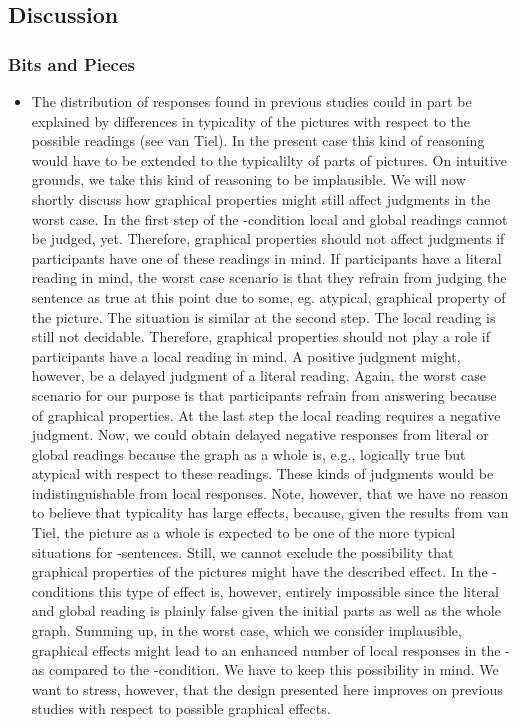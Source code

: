 \documentclass[fleqn,reqno,10pt,draft]{article}
\newcommand{\as}{\acro{as}}
\renewcommand{\es}{\acro{es}}
\begin{document}
\subsection{Discussion}
\label{sec:discussion}

\subsubsection{Bits and Pieces}
\label{sec:bits-pieces}

\begin{itemize}
\item The distribution of
responses found in previous studies could in part be explained by
differences in typicality of the pictures with respect to the possible
readings (see van Tiel). In the present case this kind of reasoning
would have to be extended to the typicalilty of parts of pictures. On
intuitive grounds, we take this kind of reasoning to be
implausible. We will now shortly discuss how graphical properties
might still affect judgments in the worst case. In the first step of
the \as-condition local and global readings cannot be judged,
yet. Therefore, graphical properties should not affect judgments if
participants have one of these readings in mind. If participants have
a literal reading in mind, the worst case scenario is that they
refrain from judging the sentence as true at this point due to some,
eg. atypical, graphical property of the picture. The situation is
similar at the second step. The local reading is still not
decidable. Therefore, graphical properties should not play a role if
participants have a local reading in mind. A positive judgment might,
however, be a delayed judgment of a literal reading. Again, the worst
case scenario for our purpose is that participants refrain from
answering because of graphical properties. At the last step the local
reading requires a negative judgment. Now, we could obtain delayed
negative responses from literal or global readings because the graph
as a whole is, e.g., logically true but atypical with respect to these
readings. These kinds of judgments would be indistinguishable from
local responses. Note, however, that we have no reason to believe that
typicality has large effects, because, given the results from van
Tiel, the picture as a whole is expected to be one of the more typical
situations for \as-sentences. Still, we cannot exclude the possibility
that graphical properties of the pictures might have the described
effect. In the \es-conditions this type of effect is, however,
entirely impossible since the literal and global reading is plainly
false given the initial parts as well as the whole graph. Summing up,
in the worst case, which we consider implausible, graphical effects
might lead to an enhanced number of local responses in the \as- as
compared to the \es-condition. We have to keep this possibility in
mind. We want to stress, however, that the design presented here
improves on previous studies with respect to possible graphical
effects.
\end{itemize}
\end{document}
